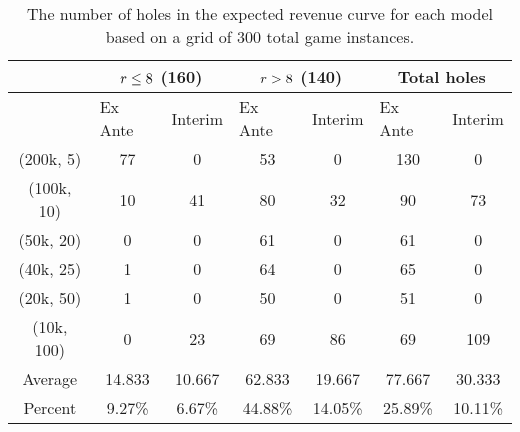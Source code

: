 \begin{table}[ht]
\begin{tabular}{c|cc|cc|cc}
           & \multicolumn{2}{c}{$r \leq 8$ (160)}               & \multicolumn{2}{c}{$r > 8$ (140)}                & \multicolumn{2}{c}{Total holes}                           \\
\hline
           & \multicolumn{1}{l}{Ex Ante} & \multicolumn{1}{l}{Interim} & \multicolumn{1}{l}{Ex Ante} & 
           \multicolumn{1}{l}{Interim} & \multicolumn{1}{l}{Ex Ante} & \multicolumn{1}{l}{Interim} \\
\hline 
(200k, 5)  & 77                          & 0                           & 53                          & 0                           & 130                         & 0                           \\
(100k, 10) & 10                          & 41                          & 80                          & 32                          & 90                          & 73                          \\
(50k, 20)  & 0                           & 0                           & 61                          & 0                           & 61                          & 0                           \\
(40k, 25)  & 1                           & 0                           & 64                          & 0                           & 65                          & 0                           \\
(20k, 50)  & 1                           & 0                           & 50                          & 0                           & 51                          & 0                           \\
(10k, 100) & 0                           & 23                          & 69                          & 86                          & 69                          & 109                         \\

\hline 
Average    & 14.833                      & 10.667                      & 62.833                      & 19.667                      & 77.667                      & 30.333                      \\
\hline 
Percent    & 9.27\%                      & 6.67\%                      & 44.88\%                     & 14.05\%                     & 25.89\%                     & 10.11\%                    
\end{tabular}
\caption{The number of holes in the expected revenue curve for each model based on a grid of 300 total game instances.}
\label{table:game1_holes}
\end{table}